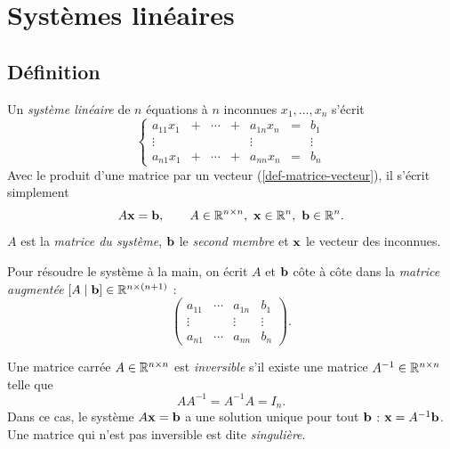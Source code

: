 
\chapter{Systèmes linéaires}
\label{chap-systemes}

\section{Définition}

\begin{definition}
Un \emph{système linéaire} de $n$ équations à $n$
inconnues $x_1, \dots, x_n$ s'écrit
\[
    \left\{
    \begin{array}{ccccccc}
        a_{11} x_1 & + & \cdots & + & a_{1n} x_n & = & b_1 \\
        \vdots     &   &        &   & \vdots     &   & \vdots \\
        a_{n1} x_1 & + & \cdots & + & a_{nn} x_n & = & b_n
    \end{array}
    \right.
\]
Avec le produit d'une matrice par un vecteur
(\cref{def-matrice-vecteur}), il s'écrit simplement
\[
    A\mathbf{x} = \mathbf{b},
    \qquad
    A \in \mathbb{R}^{n \times n},\
    \mathbf{x} \in \mathbb{R}^n,\
    \mathbf{b} \in \mathbb{R}^n.
\]
$A$ est la \emph{matrice du système}, $\mathbf{b}$ le
\emph{second membre} et $\mathbf{x}$ le vecteur des
inconnues.
\end{definition}

\begin{definition}
Pour résoudre le système à la main, on écrit $A$ et
$\mathbf{b}$ côte à côte dans la \emph{matrice augmentée}
$[A \mid \mathbf{b}] \in \mathbb{R}^{n \times (n+1)}$ :
\[
    \left(
    \begin{array}{ccc|c}
        a_{11} & \cdots & a_{1n} & b_1 \\
        \vdots &        & \vdots & \vdots \\
        a_{n1} & \cdots & a_{nn} & b_n
    \end{array}
    \right).
\]
\end{definition}

\begin{definition}
Une matrice carrée $A \in \mathbb{R}^{n \times n}$ est
\emph{inversible} s'il existe une matrice
$A^{-1} \in \mathbb{R}^{n \times n}$ telle que
\[
    A A^{-1} = A^{-1} A = I_n.
\]
Dans ce cas, le système $A\mathbf{x} = \mathbf{b}$ a une
solution unique pour tout $\mathbf{b}$ :
$\mathbf{x} = A^{-1}\mathbf{b}$. Une matrice qui n'est
pas inversible est dite \emph{singulière}.
\end{definition}

